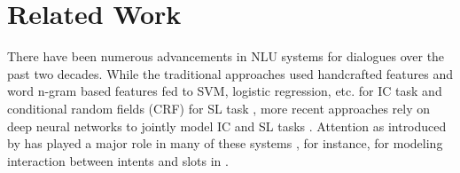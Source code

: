 \section{Related Work}
\label{sec:related_work_f}

There have been numerous advancements in NLU systems for dialogues over the past two decades. While the traditional approaches used handcrafted features and word n-gram based features fed to
SVM, logistic regression, etc. for IC task and conditional random fields (CRF) for SL task \cite{triangular_crf, wang12002combination, raymondAndRiccardi2007}, more recent approaches rely on deep neural networks to jointly model IC and SL tasks \cite{yao2014spokenLU, yao2014recurrentCR, joint_slu_recursive, zhang2016ajm, liu2016jointOS, Goo2018SlotGatedMF}. Attention as introduced by \citet{bahdanau2014neural} has played a major role in many of these systems \cite{liu2016attentionBasedRN, ma2017jointlyTS, li2018ASM, Goo2018SlotGatedMF}, for instance, for modeling interaction between intents and slots in \cite{Goo2018SlotGatedMF}.







